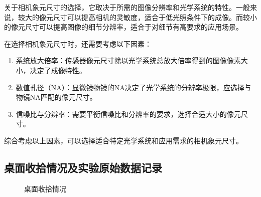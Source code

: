 \documentclass[dvipsnames, svgnames,a4paper,11pt]{article}
\begin{document}
关于相机象元尺寸的选择，它取决于所需的图像分辨率和光学系统的特性。一般来说，较大的像元尺寸可以提高相机的灵敏度，适合于低光照条件下的成像。而较小的像元尺寸可以提高图像的细节分辨率，适合于对细节有高要求的应用场景。

在选择相机象元尺寸时，还需要考虑以下因素：

\begin{enumerate}
	\item 系统放大倍率：传感器像元尺寸除以光学系统总放大倍率得到的图像像素大小，决定了成像特性。
	\item 数值孔径（NA）：显微镜物镜的NA决定了光学系统的分辨率极限，应选择与物镜NA匹配的像元尺寸。
	\item 信噪比与分辨率：需要平衡信噪比和分辨率的要求，选择合适大小的像元尺寸。
\end{enumerate}

综合考虑以上因素，可以选择适合特定光学系统和应用需求的相机象元尺寸。
	

\clearpage

\subsection{桌面收拾情况及实验原始数据记录}

\begin{figure}[htbp]
	\centering
	\quad
	\caption{桌面收拾情况}
\end{figure}
\end{document}

